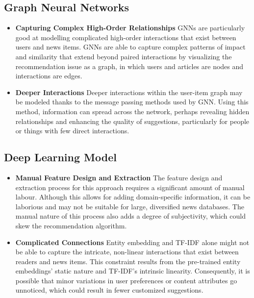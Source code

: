 \documentclass[9pt,twocolumn,twoside,lineno]{gsajnl}
\begin{document}
\subsection{Graph Neural Networks}
\begin{itemize}
    \item \textbf{Capturing Complex High-Order Relationships\newline} GNNs are particularly good at modelling complicated high-order interactions that exist between users and news items. GNNs are able to capture complex patterns of impact and similarity that extend beyond paired interactions by visualizing the recommendation issue as a graph, in which users and articles are nodes and interactions are edges.
    \item \textbf{Deeper Interactions\newline} Deeper interactions within the user-item graph may be modeled thanks to the message passing methods used by GNN. Using this method, information can spread across the network, perhaps revealing hidden relationships and enhancing the quality of suggestions, particularly for people or things with few direct interactions.
\end{itemize}

\subsection{Deep Learning Model}
\begin{itemize}
    \item \textbf{Manual Feature Design and Extraction\newline} The feature design and extraction process for this approach requires a significant amount of manual labour. Although this allows for adding domain-specific information, it can be laborious and may not be suitable for large, diversified news databases. The manual nature of this process also adds a degree of subjectivity, which could skew the recommendation algorithm.
    \item \textbf{Complicated Connections\newline} Entity embedding and TF-IDF alone might not be able to capture the intricate, non-linear interactions that exist between readers and news items. This constraint results from the pre-trained entity embeddings' static nature and TF-IDF's intrinsic linearity. Consequently, it is possible that minor variations in user preferences or content attributes go unnoticed, which could result in fewer customized suggestions.
\end{itemize}
\end{document}
